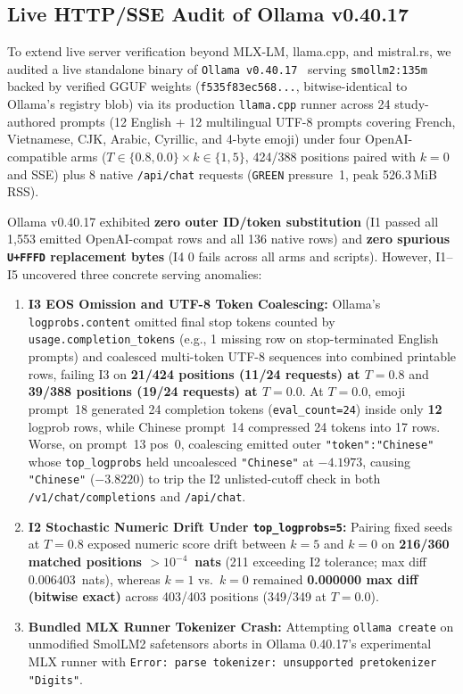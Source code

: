 \documentclass[11pt,letterpaper]{article}
\begin{document}
\subsection{Live HTTP/SSE Audit of Ollama v0.40.17}
\label{sec:rq1-ollama}
To extend live server verification beyond MLX-LM, llama.cpp, and mistral.rs, we audited a live standalone binary of \texttt{Ollama v0.40.17}~\cite{ollamarel} serving \texttt{smollm2:135m} backed by verified GGUF weights (\texttt{f535f83ec568...}, bitwise-identical to Ollama's registry blob) via its production \texttt{llama.cpp} runner across 24 study-authored prompts (12 English + 12 multilingual UTF-8 prompts covering French, Vietnamese, CJK, Arabic, Cyrillic, and 4-byte emoji) under four OpenAI-compatible arms ($T\in\{0.8, 0.0\} \times k\in\{1, 5\}$, 424/388 positions paired with $k=0$ and SSE) plus 8 native \texttt{/api/chat} requests (\texttt{GREEN} pressure~1, peak 526.3\,MiB RSS).

Ollama v0.40.17 exhibited \textbf{zero outer ID/token substitution} (\textsc{I1} passed all 1,553 emitted OpenAI-compat rows and all 136 native rows) and \textbf{zero spurious \texttt{U+FFFD} replacement bytes} (\textsc{I4} 0 fails across all arms and scripts). However, \textsc{I1}--\textsc{I5} uncovered three concrete serving anomalies:
\begin{enumerate}
\item \textbf{I3 EOS Omission and UTF-8 Token Coalescing:} Ollama's \texttt{logprobs.\allowbreak content} omitted final stop tokens counted by \texttt{usage.completion\_tokens} (e.g., 1 missing row on stop-terminated English prompts) and coalesced multi-token UTF-8 sequences into combined printable rows, failing \textsc{I3} on \textbf{21/424 positions (11/24 requests) at $T=0.8$} and \textbf{39/388 positions (19/24 requests) at $T=0.0$}. At $T=0.0$, emoji prompt~18 generated 24 completion tokens (\texttt{eval\_count=24}) inside only \textbf{12} logprob rows, while Chinese prompt~14 compressed 24 tokens into 17 rows. Worse, on prompt~13 pos~0, coalescing emitted outer \texttt{"token":"}\guillemotleft\texttt{Chinese"} whose \texttt{top\_logprobs} held uncoalesced \texttt{"Chinese"} at $-4.1973$, causing \texttt{"}\guillemotleft\texttt{Chinese"} ($-3.8220$) to trip the \textsc{I2} unlisted-cutoff check in both \texttt{/v1/chat/completions} and \texttt{/api/chat}.
\item \textbf{I2 Stochastic Numeric Drift Under \texttt{top\_logprobs=5}:} Pairing fixed seeds at $T=0.8$ exposed numeric score drift between $k=5$ and $k=0$ on \textbf{216/360 matched positions $>10^{-4}$~nats} (211 exceeding \textsc{I2} tolerance; max diff $0.006403$~nats), whereas $k=1$ vs.\ $k=0$ remained \textbf{0.000000 max diff (bitwise exact)} across 403/403 positions (349/349 at $T=0.0$).
\item \textbf{Bundled MLX Runner Tokenizer Crash:} Attempting \texttt{ollama create} on unmodified SmolLM2 safetensors aborts in Ollama 0.40.17's experimental MLX runner with \texttt{Error: parse tokenizer: unsupported pretokenizer "Digits"}.
\end{enumerate}
\end{document}
